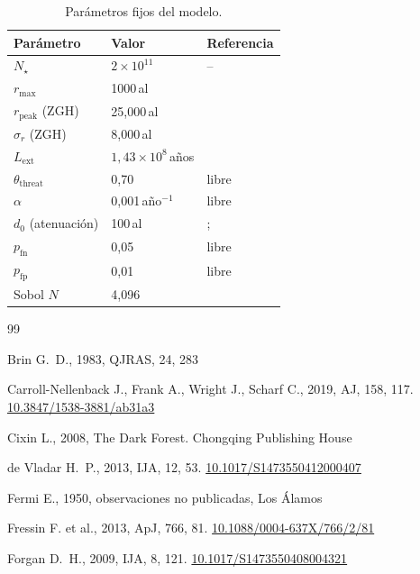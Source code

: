 \documentclass[11pt,a4paper,onecolumn]{article}
\newcommand{\doi}[1]{\href{https://doi.org/#1}{#1}}
\begin{document}
\begin{table}[h]
\begin{table}
  \centering
  \caption{Parámetros fijos del modelo.}
  \label{tab:params}
  \begin{tabular}{lll}
    \toprule
    Parámetro & Valor & Referencia \\
    \midrule
    $N_\star$ & $2\times10^{11}$ & -- \\
    $r_\text{max}$ & 1000\,al & \citet{troitskij1989,loeb2007} \\
    $r_\text{peak}$ (ZGH) & 25{,}000\,al & \citet{lineweaver2004} \\
    $\sigma_r$ (ZGH) & 8{,}000\,al & \citet{lineweaver2004} \\
    $L_\text{ext}$ & $1{,}43\times10^8$\,años & \citet{sandberg2018} \\
    $\theta_\text{threat}$ & 0{,}70 & libre \\
    $\alpha$ & 0{,}001\,año$^{-1}$ & libre \\
    $d_0$ (atenuación) & 100\,al & \citet{loeb2007}; \citet{forgannichol2011} \\
    $p_\text{fn}$ & 0{,}05 & libre \\
    $p_\text{fp}$ & 0{,}01 & libre \\
    Sobol $N$ & 4{,}096 & \citet{saltelli2010} \\
    \bottomrule
  \end{tabular}
\end{table}

\begin{thebibliography}{99}

Brin G.~D., 1983, QJRAS, 24, 283

Carroll-Nellenback J., Frank A., Wright J., Scharf C., 2019, AJ, 158, 117.
\newblock \doi{10.3847/1538-3881/ab31a3}

Cixin L., 2008, The Dark Forest. Chongqing Publishing House

de Vladar H.~P., 2013, IJA, 12, 53.
\newblock \doi{10.1017/S1473550412000407}

Fermi E., 1950, observaciones no publicadas, Los Álamos

Fressin F. et al., 2013, ApJ, 766, 81.
\newblock \doi{10.1088/0004-637X/766/2/81}

Forgan D.~H., 2009, IJA, 8, 121.
\newblock \doi{10.1017/S1473550408004321}


\end{thebibliography}
\end{table}
\end{document}
